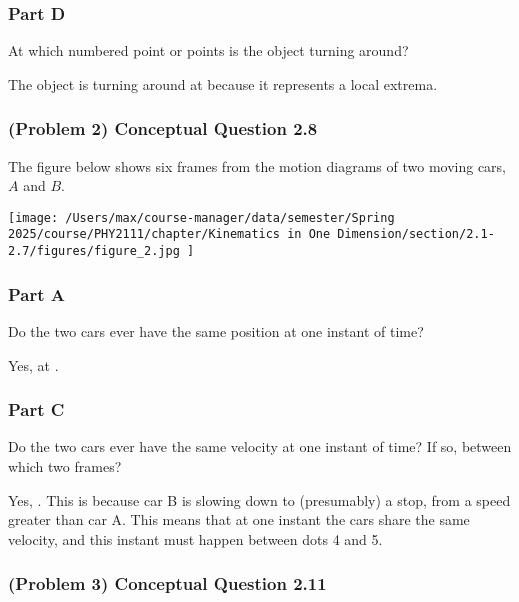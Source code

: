 \subsubsection{Part D}
At which numbered point or points is the object turning around?

\begin{solution}
	The object is turning around at  because it represents a local extrema.
\end{solution}

\newpage

\subsubsection{(Problem 2) Conceptual Question 2.8}

The figure below shows six frames from the motion diagrams of two moving cars, $A$ and $B$.

\begin{center}
	\texttt{[image: /Users/max/course-manager/data/semester/Spring 2025/course/PHY2111/chapter/Kinematics in One Dimension/section/2.1-2.7/figures/figure\_2.jpg
	]}
\end{center}

\subsubsection{Part A}
Do the two cars ever have the same position at one instant of time?

\begin{solution}
	Yes, at .
\end{solution}

\subsubsection{Part C}
Do the two cars ever have the same velocity at one instant of time? If so, between which two frames?

\begin{solution}
	Yes, . This is because car B is slowing down to (presumably) a stop, from a speed greater than car A. This means that at one instant the cars share the same velocity, and this instant must happen between dots 4 and 5.
\end{solution}

\newpage

\subsubsection{(Problem 3) Conceptual Question 2.11}

